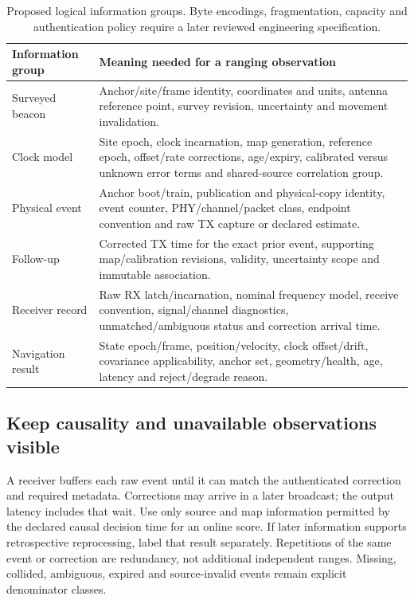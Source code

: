 \documentclass[11pt,letterpaper]{article}
\begin{document}
\begin{table}[ht]\centering\small
\caption{Proposed logical information groups. Byte encodings, fragmentation, capacity and authentication policy require a later reviewed engineering specification.}\label{tab:contract}
\begin{tabular}{@{}L{31mm}L{114mm}@{}}\toprule
Information group & Meaning needed for a ranging observation\\\midrule
Surveyed beacon &Anchor/site/frame identity, coordinates and units, antenna reference point, survey revision, uncertainty and movement invalidation.\\\addlinespace
Clock model &Site epoch, clock incarnation, map generation, reference epoch, offset/rate corrections, age/expiry, calibrated versus unknown error terms and shared-source correlation group.\\\addlinespace
Physical event &Anchor boot/train, publication and physical-copy identity, event counter, PHY/channel/packet class, endpoint convention and raw TX capture or declared estimate.\\\addlinespace
Follow-up &Corrected TX time for the exact prior event, supporting map/calibration revisions, validity, uncertainty scope and immutable association.\\\addlinespace
Receiver record &Raw RX latch/incarnation, nominal frequency model, receive convention, signal/channel diagnostics, unmatched/ambiguous status and correction arrival time.\\\addlinespace
Navigation result &State epoch/frame, position/velocity, clock offset/drift, covariance applicability, anchor set, geometry/health, age, latency and reject/degrade reason.\\\bottomrule
\end{tabular}
\end{table}

\subsection{Keep causality and unavailable observations visible}
A receiver buffers each raw event until it can match the authenticated correction and required metadata. Corrections may arrive in a later broadcast; the output latency includes that wait. Use only source and map information permitted by the declared causal decision time for an online score. If later information supports retrospective reprocessing, label that result separately. Repetitions of the same event or correction are redundancy, not additional independent ranges. Missing, collided, ambiguous, expired and source-invalid events remain explicit denominator classes.
\end{document}
